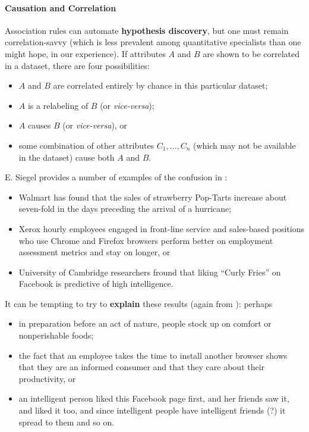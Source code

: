 \paragraph{Causation and Correlation}
Association rules can automate \textbf{hypothesis discovery}, but one must remain correlation-savvy (which is less prevalent among quantitative specialists than one might hope, in our experience). If attributes $A$ and $B$ are shown to be correlated in a dataset, there are four possibilities:
\begin{itemize}[noitemsep]
    \item $A$ and $B$ are correlated entirely by chance in this particular dataset;
    \item $A$ is a relabeling of $B$ (or \textit{vice-versa});
    \item $A$ causes $B$ (or \textit{vice-versa}), or 
    \item some combination of other attributes $C_1,\ldots,C_n$ (which may not be available in the dataset) cause both $A$ and $B$.
\end{itemize}
E. Siegel provides a number of examples of the confusion in \cite{DSML_ES}: \begin{itemize}[noitemsep]
\item Walmart has found that the sales of strawberry Pop-Tarts increase about seven-fold in the days preceding the arrival of a hurricane;
\item Xerox hourly employees engaged in front-line service and sales-based positions who use Chrome and Firefox browsers perform better on employment assessment metrics and stay on longer, or
\item University of Cambridge researchers fround that liking ``Curly Fries'' on Facebook is predictive of high intelligence.
\end{itemize}
It can be tempting to try to \textbf{explain} these results (again from \cite{DSML_ES}): perhaps 
\begin{itemize}[noitemsep]
\item in preparation before an act of nature, people stock up on comfort or nonperishable foods;
\item the fact that an employee takes the time to install another browser shows that they are an informed consumer and that they care about their productivity, or
\item an intelligent person liked this Facebook page first, and her friends saw it, and liked it too, and since intelligent people have intelligent friends (?) it spread to them and so on.
\end{itemize}
